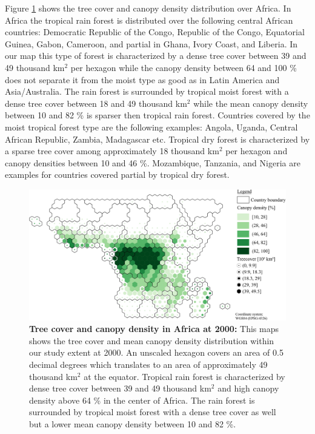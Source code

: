 			Figure \ref{fig:africa_tree_cover} shows the tree cover and canopy density distribution over Africa. In Africa the tropical rain forest is distributed over the following central African countries: Democratic Republic of the Congo, Republic of the Congo, Equatorial Guinea, Gabon, Cameroon, and partial in Ghana, Ivory Coast, and Liberia. In our map this type of forest is characterized by a dense tree cover between 39 and 49 thousand km$^2$ per hexagon while the canopy density between 64 and 100 \% does not separate it from the moist type as good as in Latin America and Asia/Australia. The rain forest is surrounded by tropical moist forest with a dense tree cover between 18 and 49 thousand km$^2$ while the mean canopy density between 10 and 82 \% is sparser then tropical rain forest. Countries covered by the moist tropical forest type are the following examples: Angola, Uganda, Central African Republic, Zambia, Madagascar etc. Tropical dry forest is characterized by a sparse tree cover among approximately 18 thousand km$^2$ per hexagon and canopy densities between 10 and 46 \%. Mozambique, Tanzania, and Nigeria are examples for countries covered partial by tropical dry forest.
			\begin{figure}[ht]
				\centering
				\includegraphics[scale=.9]{img/africa_treecover_frameless}
				\caption[Tree cover and canopy density in Africa at 2000]{\textbf{Tree cover and canopy density in Africa at 2000:} This maps shows the tree cover and mean canopy density distribution within our study extent at 2000. An unscaled hexagon covers an area of 0.5 decimal degrees which translates to an area of approximately 49 thousand km$^2$ at the equator. Tropical rain forest is characterized by dense tree cover between 39 and 49 thousand km$^2$ and high canopy density above 64 \% in the center of Africa. The rain forest is surrounded by tropical moist forest with a dense tree cover as well but a lower mean canopy density between 10 and 82 \%.}
				\label{fig:africa_tree_cover}
			\end{figure}

